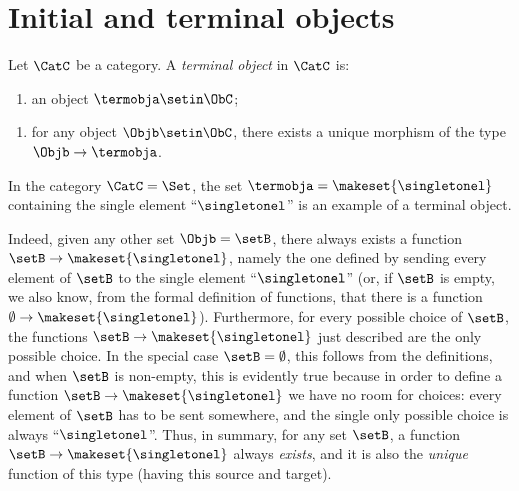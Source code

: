 
\section{Initial and terminal objects}
\label{sec:initional-terminal}




\begin{ctdefinition}\label{def:terminal-object}
Let $\CatC$ be a category. A \emph{terminal object} in $\CatC$ is: 

\constit
\begin{enumerate}
\item an object $\termobja \setin \ObC$; 
\end{enumerate}
\condit
\begin{enumerate}
\item for any object $\Objb \setin \ObC$, there exists a unique morphism of the type $\Objb \to \termobja$. 
\end{enumerate}
\end{ctdefinition}


\begin{example}\label{exa:terminal-object-in-Set}
In the category $\CatC = \Set$, the set $\termobja = \makeset{ \singletonel}$ containing the single element ``$\singletonel$'' is an example of a terminal object. 

Indeed, given any other set $\Objb = \setB$, there always exists a function $\setB \to \makeset{ \singletonel}$, namely the one defined by sending every element of $\setB$ to the single element ``$\singletonel$'' (or, if $\setB$ is empty, we also know, from the formal definition of functions, that there is a function $\emptyset \to \makeset{ \singletonel}$). Furthermore, for every possible choice of $\setB$, the functions $\setB \to \makeset{ \singletonel}$ just described are the only possible choice. In the special case $\setB = \emptyset$, this follows from the definitions, and when $\setB$ is non-empty, this is evidently true because in order to define a function $\setB \to \makeset{ \singletonel}$ we have no room for choices: every element of $\setB$ has to be sent somewhere, and the single only possible choice is always ``$\singletonel$''. Thus, in summary, for any set $\setB$, a function $\setB \to \makeset{ \singletonel}$ always \emph{exists}, and it is also the \emph{unique} function of this type (having this source and target). 
\end{example}

